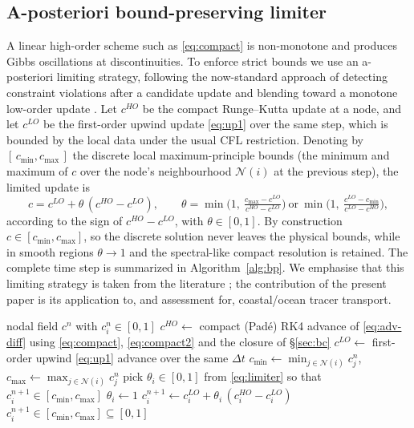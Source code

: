 \documentclass[Journal]{ascelike}   %
\begin{document}
\subsection{A-posteriori bound-preserving limiter}
\label{sec:limiter}
A linear high-order scheme such as \eqref{eq:compact} is non-monotone and produces
Gibbs oscillations at discontinuities. To enforce strict bounds we use an
a-posteriori limiting strategy, following the now-standard approach of detecting
constraint violations after a candidate update and blending toward a monotone
low-order update \citep{zalesak1979,clain2011mood,lixiezhang2018}. Let $c^{HO}$ be
the compact Runge--Kutta update at a node, and let $c^{LO}$ be the first-order
upwind update \eqref{eq:up1} over the same step, which is bounded by the local data
under the usual CFL restriction. Denoting by $[\,c_{\min},c_{\max}\,]$ the discrete
local maximum-principle bounds (the minimum and maximum of $c$ over the node's
neighbourhood $\mathcal{N}(i)$ at the previous step), the limited update is
\begin{equation}
c = c^{LO} + \theta\,(c^{HO}-c^{LO}),
\qquad
\theta=\min\!\Big(1,\ \tfrac{c_{\max}-c^{LO}}{c^{HO}-c^{LO}}\Big)\ \text{or}\
\min\!\Big(1,\ \tfrac{c^{LO}-c_{\min}}{c^{LO}-c^{HO}}\Big),
\label{eq:limiter}
\end{equation}
according to the sign of $c^{HO}-c^{LO}$, with $\theta\in[0,1]$. By construction
$c\in[c_{\min},c_{\max}]$, so the discrete solution never leaves the physical
bounds, while in smooth regions $\theta\to1$ and the spectral-like compact
resolution is retained. The complete time step is summarized in
Algorithm~\ref{alg:bp}. We emphasise that this limiting strategy is taken from the
literature \citep{lixiezhang2018}; the contribution of the present paper is its
application to, and assessment for, coastal/ocean tracer transport.

\begin{algorithm}[t]
\caption{One bound-preserving compact time step $c^{n}\!\to c^{n+1}$.}
\label{alg:bp}
\begin{algorithmic}[1]
\Require nodal field $c^{n}$ with $c^{n}_i\in[0,1]$
\State $c^{HO}\gets$ compact (Pad\'e) RK4 advance of \eqref{eq:adv-diff} using
       \eqref{eq:compact}, \eqref{eq:compact2} and the closure of \S\ref{sec:bc}
\State $c^{LO}\gets$ first-order upwind \eqref{eq:up1} advance over the same $\Delta t$
\For{each node $i$}
  \State $c_{\min}\gets\min_{j\in\mathcal{N}(i)}c^{n}_j$,\quad
         $c_{\max}\gets\max_{j\in\mathcal{N}(i)}c^{n}_j$
     \State pick $\theta_i\in[0,1]$ from \eqref{eq:limiter} so that $c^{n+1}_i\in[c_{\min},c_{\max}]$
  \Else
     \State $\theta_i\gets1$ 
  \EndIf
  \State $c^{n+1}_i\gets c^{LO}_i+\theta_i\,(c^{HO}_i-c^{LO}_i)$
\EndFor
\Ensure $c^{n+1}_i\in[c_{\min},c_{\max}]\subseteq[0,1]$
\end{algorithmic}
\end{algorithm}
\end{document}
